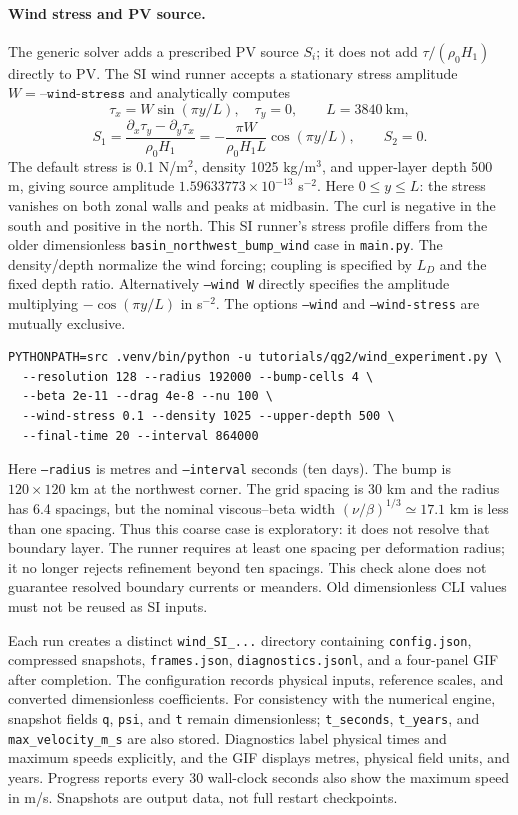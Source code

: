 \documentclass[11pt]{article}
\begin{document}
\paragraph{Wind stress and PV source.}
The generic solver adds a prescribed PV source $S_i$; it does not add
$\tau/(\rho_0H_1)$ directly to PV. The SI wind runner accepts a stationary
stress amplitude $W=\texttt{--wind-stress}$ and analytically computes
\[
 \tau_x=W\sin(\pi y/L),\quad\tau_y=0,\qquad L=3840\ \mathrm{km},
\]
\[
 S_1=\frac{\partial_x\tau_y-\partial_y\tau_x}{\rho_0H_1}
     =-\frac{\pi W}{\rho_0H_1L}\cos(\pi y/L),\qquad S_2=0.
\]
The default stress is 0.1 N/m$^2$, density 1025 kg/m$^3$, and upper-layer
depth 500 m, giving source amplitude $1.59633773\times10^{-13}$ s$^{-2}$.
Here $0\le y\le L$: the stress vanishes on both zonal walls and peaks
at midbasin. The curl is negative in the south and positive in the north.
This SI runner's stress profile differs from the older dimensionless
\texttt{basin\_northwest\_bump\_wind} case in \texttt{main.py}.
The density/depth normalize the wind forcing; coupling is specified by
$L_D$ and the fixed depth ratio. Alternatively \texttt{--wind W} directly
specifies the amplitude multiplying $-\cos(\pi y/L)$ in s$^{-2}$.
The options \texttt{--wind}
and \texttt{--wind-stress} are mutually exclusive.

\begin{verbatim}
PYTHONPATH=src .venv/bin/python -u tutorials/qg2/wind_experiment.py \
  --resolution 128 --radius 192000 --bump-cells 4 \
  --beta 2e-11 --drag 4e-8 --nu 100 \
  --wind-stress 0.1 --density 1025 --upper-depth 500 \
  --final-time 20 --interval 864000
\end{verbatim}
Here \texttt{--radius} is metres and \texttt{--interval} seconds (ten days).
The bump is $120\times120$ km at the northwest corner. The grid spacing
is 30 km and the radius has 6.4 spacings, but the nominal viscous--beta
width $(\nu/\beta)^{1/3}\simeq17.1$ km is less than one spacing.
Thus this coarse case is exploratory: it does not resolve that boundary
layer. The runner requires at least one spacing per deformation radius;
it no longer rejects refinement beyond ten spacings. This check alone
does not guarantee resolved boundary currents or meanders.
Old dimensionless CLI values must not be reused as SI inputs.

Each run creates a distinct \texttt{wind\_SI\_...} directory containing
\texttt{config.json}, compressed snapshots, \texttt{frames.json},
\texttt{diagnostics.jsonl}, and a four-panel GIF after completion.
The configuration records physical inputs, reference scales, and converted
dimensionless coefficients. For consistency with the numerical engine,
snapshot fields \texttt{q}, \texttt{psi}, and \texttt{t} remain dimensionless;
\texttt{t\_seconds}, \texttt{t\_years}, and \texttt{max\_velocity\_m\_s}
are also stored. Diagnostics label physical times and maximum speeds
explicitly, and the GIF displays metres, physical field units, and years.
Progress reports every 30 wall-clock seconds also show the maximum speed
in m/s. Snapshots are output data, not full restart checkpoints.
\end{document}
